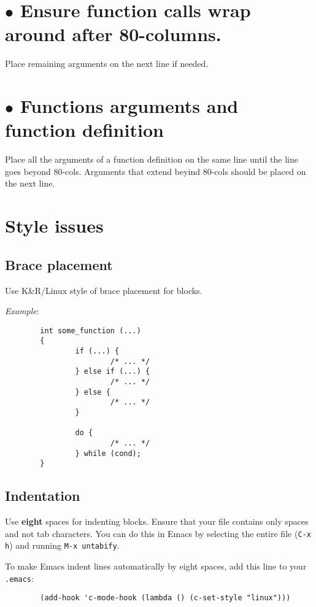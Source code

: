 \documentclass{article}[12pt]
\begin{document}
\section*{$\bullet$ Ensure function calls wrap around after
80-columns.}
Place remaining arguments on the next line if needed.

\section*{$\bullet$ Functions arguments and function definition}
Place all the arguments of a function definition on the same line
until the line goes beyond 80-cols. Arguments that extend beyind
80-cols should be placed on the next line.

\section*{Style issues}

\subsection*{Brace placement}
Use K\&R/Linux style of brace placement for blocks.

\textsl{Example}:
\begin{verbatim}
        int some_function (...)
        {
                if (...) {
                        /* ... */
                } else if (...) {
                        /* ... */
                } else {
                        /* ... */
                }

                do {
                        /* ... */
                } while (cond);
        }
\end{verbatim}

\subsection*{Indentation}
Use \textbf{eight} spaces for indenting blocks. Ensure that your
file contains only spaces and not tab characters. You can do this
in Emacs by selecting the entire file (\texttt{C-x h}) and
running \texttt{M-x untabify}.

To make Emacs indent lines automatically by eight spaces, add this
line to your \texttt{.emacs}:

\begin{verbatim}
        (add-hook 'c-mode-hook (lambda () (c-set-style "linux")))
\end{verbatim}
\end{document}
